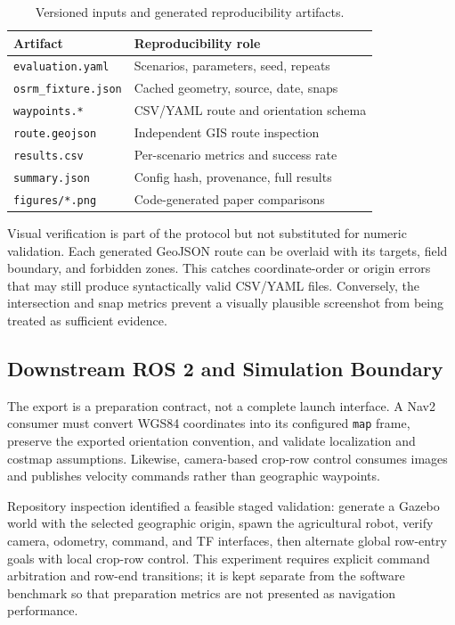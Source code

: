 \documentclass[conference,a4paper]{IEEEtran}
\begin{document}
\begin{table}[t]
\caption{Versioned inputs and generated reproducibility artifacts.}
\label{tab:artifacts}
\centering
\scriptsize
\begin{tabular}{ll}
\toprule
Artifact & Reproducibility role\\
\midrule
\texttt{evaluation.yaml} & Scenarios, parameters, seed, repeats\\
\texttt{osrm\_fixture.json} & Cached geometry, source, date, snaps\\
\texttt{waypoints.*} & CSV/YAML route and orientation schema\\
\texttt{route.geojson} & Independent GIS route inspection\\
\texttt{results.csv} & Per-scenario metrics and success rate\\
\texttt{summary.json} & Config hash, provenance, full results\\
\texttt{figures/*.png} & Code-generated paper comparisons\\
\bottomrule
\end{tabular}
\end{table}

Visual verification is part of the protocol but not substituted for numeric
validation. Each generated GeoJSON route can be overlaid with its targets,
field boundary, and forbidden zones. This catches coordinate-order or origin
errors that may still produce syntactically valid CSV/YAML files. Conversely,
the intersection and snap metrics prevent a visually plausible screenshot from
being treated as sufficient evidence.

\subsection{Downstream ROS 2 and Simulation Boundary}
The export is a preparation contract, not a complete launch interface. A Nav2
consumer must convert WGS84 coordinates into its configured \texttt{map}
frame, preserve the exported orientation convention, and validate localization
and costmap assumptions. Likewise, camera-based crop-row control consumes
images and publishes velocity commands rather than geographic waypoints.

Repository inspection identified a feasible staged validation: generate a
Gazebo world with the selected geographic origin, spawn the agricultural robot,
verify camera, odometry, command, and TF interfaces, then alternate global
row-entry goals with local crop-row control. This experiment requires explicit
command arbitration and row-end transitions; it is kept separate from the
software benchmark so that preparation metrics are not presented as navigation
performance.
\end{document}
